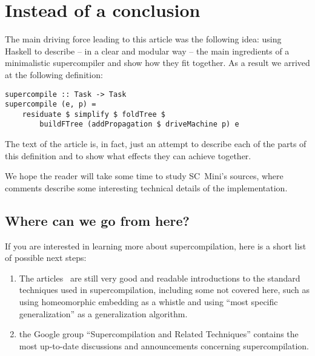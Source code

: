\section{Instead of a conclusion}

The main driving force leading to this article was the following idea: 
using Haskell to describe -- in a clear and modular way --
the main ingredients of a minimalistic supercompiler and show how they fit together.
As a result we arrived at the following definition:
\begin{lstlisting}
supercompile :: Task -> Task
supercompile (e, p) =
	residuate $ simplify $ foldTree $
		buildFTree (addPropagation $ driveMachine p) e
\end{lstlisting}
The text of the article is, in fact, just an attempt to describe each
of the parts of this definition and to show what effects they can
achieve together.

We hope the reader will take some time to study SC~Mini's sources,
where comments describe some interesting technical details of
the implementation.

\subsection{Where can we go from here?}

If you are interested in learning more about supercompilation, here is a short
list of possible next steps:

\begin{enumerate}
  \item The articles~\cite{Sorensen1998Introduction,Sorensen1996Positive} are 
  still very good and readable introductions to the standard techniques used in supercompilation,
  including some not covered here, such as using homeomorphic embedding as a whistle and
  using ``most specific generalization'' as a generalization algorithm.
  \item the Google group ``Supercompilation and Related Techniques'' \cite{ScpGoogleGroup} contains the most
  up-to-date discussions and announcements concerning supercompilation.
  \end{enumerate}

